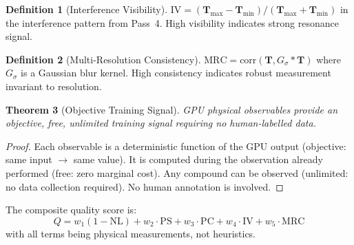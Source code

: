 \documentclass[11pt,twocolumn,a4paper]{article}
\newtheorem{theorem}{Theorem}[section]
\theoremstyle{definition}
\newtheorem{definition}[theorem]{Definition}
\theoremstyle{remark}
\newcommand{\Texture}{\mathbf{T}}
\begin{document}
\begin{definition}[Interference Visibility]
$\mathrm{IV} = (\Texture_{\max} - \Texture_{\min}) / (\Texture_{\max} + \Texture_{\min})$ in the interference pattern from Pass~4. High visibility indicates strong resonance signal.
\end{definition}

\begin{definition}[Multi-Resolution Consistency]
$\mathrm{MRC} = \mathrm{corr}(\Texture, G_\sigma * \Texture)$ where $G_\sigma$ is a Gaussian blur kernel. High consistency indicates robust measurement invariant to resolution.
\end{definition}

\begin{theorem}[Objective Training Signal]
\label{thm:objective}
GPU physical observables provide an objective, free, unlimited training signal requiring no human-labelled data.
\end{theorem}

\begin{proof}
Each observable is a deterministic function of the GPU output (objective: same input $\to$ same value). It is computed during the observation already performed (free: zero marginal cost). Any compound can be observed (unlimited: no data collection required). No human annotation is involved.
\end{proof}

The composite quality score is:
\begin{equation}
Q = w_1(1 - \mathrm{NL}) + w_2 \cdot \mathrm{PS} + w_3 \cdot \mathrm{PC} + w_4 \cdot \mathrm{IV} + w_5 \cdot \mathrm{MRC}
\label{eq:quality}
\end{equation}
with all terms being physical measurements, not heuristics.
\end{document}

